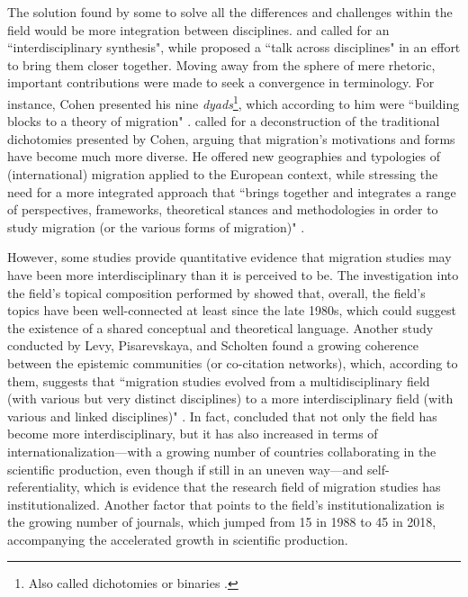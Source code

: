 The solution found by some to solve all the differences and challenges within the field would be more integration between disciplines. \cite{king_towards_2002} and \cite{king_theories_2012} called for an ``interdisciplinary synthesis", while \cite{brettell_introduction_2015} proposed a ``talk across disciplines" in an effort to bring them closer together. Moving away from the sphere of mere rhetoric, important contributions were made to seek a convergence in terminology. For instance, Cohen presented his nine \textit{dyads}\footnote{Also called dichotomies or binaries \citep{king_theories_2012}.}, which according to him were ``building blocks to a theory of migration" \citep[p. xvi]{cohen_introduction_1996}. \cite{king_towards_2002} called for a deconstruction of the traditional dichotomies presented by Cohen, arguing that migration's motivations and forms have become much more diverse. He offered new geographies and typologies of (international) migration applied to the European context, while stressing the need for a more integrated approach that ``brings together and integrates a range of perspectives, frameworks, theoretical stances and methodologies in order to study migration (or the various forms of migration)" \citep[p. 90]{king_towards_2002}.

However, some studies provide quantitative evidence that migration studies may have been more interdisciplinary than it is perceived to be. The investigation into the field's topical composition performed by \cite{pisarevskaya_mapping_2020} showed that, overall, the field's topics have been well-connected at least since the late 1980s, which could suggest the existence of a shared conceptual and theoretical language. Another study conducted by Levy, Pisarevskaya, and Scholten found a growing coherence between the epistemic communities (or co-citation networks), which, according to them, suggests that ``migration studies evolved from a multidisciplinary field (with various but very distinct disciplines) to a more interdisciplinary field (with various and linked disciplines)" \citep[p. 22-23]{levy_between_2020}. In fact, \cite{levy_between_2020} concluded that not only the field has become more interdisciplinary, but it has also increased in terms of internationalization---with a growing number of countries collaborating in the scientific production, even though if still in an uneven way---and self-referentiality, which is evidence that the research field of migration studies has institutionalized. Another factor that points to the field's institutionalization is the growing number of journals, which jumped from 15 in 1988 to 45 in 2018, accompanying the accelerated growth in scientific production.

